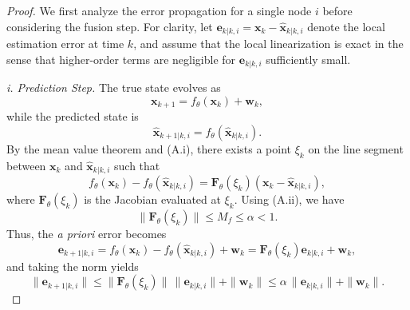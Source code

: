 \documentclass[letterpaper, 10 pt, conference]{ieeeconf}
\begin{document}
\begin{proof}
We first analyze the error propagation for a single node $i$ before considering the fusion step. For clarity, let $\mathbf{e}_{k|k,i} = \mathbf{x}_k - \hat{\mathbf{x}}_{k|k,i}$ denote the local estimation error at time $k$, and assume that the local linearization is exact in the sense that higher-order terms are negligible for $\mathbf{e}_{k|k,i}$ sufficiently small.

\noindent\textit{i. Prediction Step.}  
The true state evolves as
\begin{equation}
    \mathbf{x}_{k+1} = f_\theta(\mathbf{x}_k) + \mathbf{w}_k,
    \label{eq:true_evolution}
\end{equation}
while the predicted state is
\begin{equation}
    \hat{\mathbf{x}}_{k+1|k,i} = f_\theta(\hat{\mathbf{x}}_{k|k,i}).
    \label{eq:predicted_state}
\end{equation}
By the mean value theorem and (A.i), there exists a point $\xi_k$ on the line segment between $\mathbf{x}_k$ and $\hat{\mathbf{x}}_{k|k,i}$ such that
\begin{equation}
    f_\theta(\mathbf{x}_k) - f_\theta(\hat{\mathbf{x}}_{k|k,i}) = \mathbf{F}_\theta(\xi_k)(\mathbf{x}_k - \hat{\mathbf{x}}_{k|k,i}),
    \label{eq:mean_value}
\end{equation}
where $\mathbf{F}_\theta(\xi_k)$ is the Jacobian evaluated at $\xi_k$. Using (A.ii), we have
\begin{equation}
    \|\mathbf{F}_\theta(\xi_k)\| \leq M_f \leq \alpha < 1.
\end{equation}
Thus, the \emph{a priori} error becomes
\begin{equation}
    \mathbf{e}_{k+1|k,i} = f_\theta(\mathbf{x}_k) - f_\theta(\hat{\mathbf{x}}_{k|k,i}) + \mathbf{w}_k = \mathbf{F}_\theta(\xi_k) \mathbf{e}_{k|k,i} + \mathbf{w}_k,
\end{equation}
and taking the norm yields
\begin{equation}
    \|\mathbf{e}_{k+1|k,i}\| \leq \|\mathbf{F}_\theta(\xi_k)\|\, \|\mathbf{e}_{k|k,i}\| + \|\mathbf{w}_k\| \leq \alpha\, \|\mathbf{e}_{k|k,i}\| + \|\mathbf{w}_k\|.
    \label{eq:prediction_bound}
\end{equation}


\end{proof}
\end{document}
